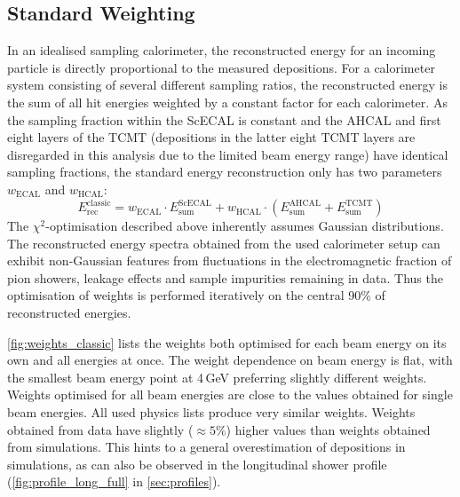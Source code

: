 \documentclass[twoside,a4paper,12pt]{article}
\begin{document}
\subsection{Standard Weighting}\label{sec:energyrecoclassic}
In an idealised sampling calorimeter, the reconstructed energy for an incoming particle is directly proportional to the measured depositions. For a calorimeter system consisting of several different sampling ratios, the reconstructed energy is the sum of all hit energies weighted by a constant factor for each calorimeter. As the sampling fraction within the ScECAL is constant and the AHCAL and first eight layers of the TCMT (depositions in the latter eight TCMT layers are disregarded in this analysis due to the limited beam energy range) have identical sampling fractions, the standard energy reconstruction only has two parameters $w_{\text{ECAL}}$ and $w_{\text{HCAL}}$:  
\begin{equation}
 E_\text{rec}^\text{classic}=w_{\text{ECAL}}\cdot E^\text{ScECAL}_\text{sum} + w_{\text{HCAL}}\cdot \left( E^\text{AHCAL}_\text{sum} + E^\text{TCMT}_\text{sum}\right) 
\end{equation}
The $\chi^2$-optimisation described above inherently assumes Gaussian distributions. The reconstructed energy spectra obtained from the used calorimeter setup can exhibit non-Gaussian features from fluctuations in the electromagnetic fraction of pion showers, leakage effects and sample impurities remaining in data. Thus the optimisation of weights is performed iteratively on the central 90\% of reconstructed energies. 

\autoref{fig:weights_classic} lists the weights both optimised for each beam energy on its own and all energies at once. The weight dependence on beam energy is flat, with the smallest beam energy point at 4\,GeV preferring slightly different weights. Weights optimised for all beam energies are close to the values obtained for single beam energies. All used physics lists produce very similar weights. Weights obtained from data have slightly ($\approx5\%$) higher values than weights obtained from simulations. This hints to a general overestimation of depositions in simulations, as can also be observed in the longitudinal shower profile (\autoref{fig:profile_long_full} in \autoref{sec:profiles}).
\end{document}
